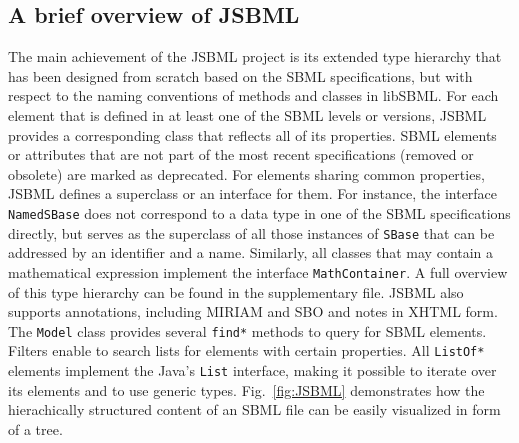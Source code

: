 \documentclass{bioinfo}
\begin{document}
\begin{methods}
\section{A brief overview of JSBML}

The main achievement of the JSBML project is its extended type hierarchy that has been designed
from scratch based on the SBML specifications, but with respect to the naming conventions of
methods and classes in libSBML. For each element that is defined in at least one of the SBML levels
or versions, JSBML provides a corresponding class that reflects all of its
properties. SBML elements or attributes that are not part of the most
recent specifications (removed or obsolete) are marked as deprecated. For
elements sharing common properties, JSBML defines a superclass or an interface
for them. For instance, the interface \texttt{NamedSBase} does not correspond to a
data type in one of the SBML specifications directly, but serves as the
superclass of all those instances of \texttt{SBase} that can be addressed by an identifier and
a name. Similarly, all classes that may contain a mathematical expression implement the
interface \texttt{MathContainer}. A full overview of this type hierarchy can be found in the supplementary
file. JSBML also supports annotations, including MIRIAM \citep{Novere2005} and
SBO \citep{Novere2006b, Holland2008}
and notes in XHTML form.
The \texttt{Model} class provides several \texttt{find*}
methods to query for SBML elements. Filters enable to search lists for elements with certain properties.
All \texttt{ListOf*} elements implement the Java's \texttt{List} interface,
making it possible to iterate over its elements and to use generic types.
Fig.~\ref{fig:JSBML} demonstrates how the hierachically structured content of an SBML file
can be easily visualized in form of a tree.
\begin{figure}
\centerline{
  }
\end{figure}
\end{methods}
\end{document}

